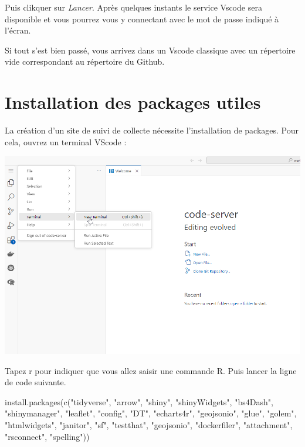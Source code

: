 \documentclass[
  letterpaper,
  DIV=11,
  numbers=noendperiod]{scrreprt}
\newenvironment{Shaded}{\begin{snugshade}}{\end{snugshade}}
\newcommand{\FunctionTok}[1]{\textcolor[rgb]{0.28,0.35,0.67}{#1}}
\newcommand{\NormalTok}[1]{\textcolor[rgb]{0.00,0.23,0.31}{#1}}
\newcommand{\StringTok}[1]{\textcolor[rgb]{0.13,0.47,0.30}{#1}}
\begin{document}
Puis clikquer sur \emph{Lancer}. Après quelques instants le service
Vscode sera disponible et vous pourrez vous y connectant avec le mot de
passe indiqué à l'écran.

Si tout s'est bien passé, vous arrivez dans un Vscode classique avec un
répertoire vide correspondant au répertoire du Github.

\hypertarget{installation-des-packages-utiles}{%
\section{Installation des packages
utiles}\label{installation-des-packages-utiles}}

La création d'un site de suivi de collecte nécessite l'installation de
packages. Pour cela, ouvrez un terminal VScode :

\includegraphics{./images/VSCode_new_terminal.png}

Tapez r pour indiquer que vous allez saisir une commande R. Puis lancer
la ligne de code suivante.

\begin{Shaded}
\begin{Highlighting}[]
\FunctionTok{install.packages}\NormalTok{(}\FunctionTok{c}\NormalTok{(}\StringTok{"tidyverse"}\NormalTok{, }\StringTok{"arrow"}\NormalTok{, }\StringTok{"shiny"}\NormalTok{, }\StringTok{"shinyWidgets"}\NormalTok{, }\StringTok{"bs4Dash"}\NormalTok{, }\StringTok{"shinymanager"}\NormalTok{, }\StringTok{"leaflet"}\NormalTok{, }\StringTok{"config"}\NormalTok{, }\StringTok{"DT"}\NormalTok{, }\StringTok{"echarts4r"}\NormalTok{, }\StringTok{"geojsonio"}\NormalTok{, }\StringTok{"glue"}\NormalTok{, }\StringTok{"golem"}\NormalTok{, }\StringTok{"htmlwidgets"}\NormalTok{, }\StringTok{"janitor"}\NormalTok{, }\StringTok{"sf"}\NormalTok{, }\StringTok{"testthat"}\NormalTok{, }\StringTok{"geojsonio"}\NormalTok{, }\StringTok{"dockerfiler"}\NormalTok{, }\StringTok{"attachment"}\NormalTok{, }\StringTok{"rsconnect"}\NormalTok{, }\StringTok{"spelling"}\NormalTok{))}
\end{Highlighting}
\end{Shaded}
\end{document}
